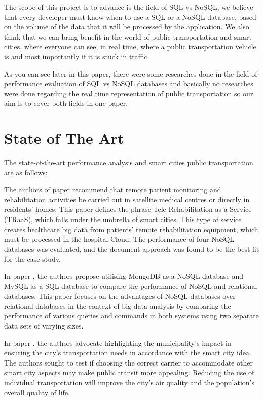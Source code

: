 \tab The scope of this project is to advance is the field of SQL vs NoSQL, we believe that every developer must know when to use a SQL or a NoSQL database, based on the volume of the data that it will be processed by the application. We also think that we can bring benefit in the world of public transportation and smart cities, where everyone can see, in real time, where a public transportation vehicle is and most importantly if it is stuck in traffic. \cite{smart-cities-details-fom-eu}

\tab As you can see later in this paper, there were some researches done in the field of performance evaluation of SQL vs NoSQL databases and basically no researches were done regarding the real time representation of public transportation so our aim is to cover both fields in one paper.

\section {State of The Art}
\tab The state-of-the-art performance analysis and smart cities public transportation are as follows:

\tab The authors of paper \cite{information_management_in_IoT} recommend that remote patient monitoring and rehabilitation activities be carried out in satellite medical centres or directly in residents' homes. This paper defines the phrase Tele-Rehabilitation as a Service (TRaaS), which falls under the umbrella of smart cities. This type of service creates healthcare big data from patients' remote rehabilitation equipment, which must be processed in the hospital Cloud. The performance of four NoSQL databases was evaluated, and the document approach was found to be the best fit for the case study.
\newline

\tab In paper \cite{performance_analysis_SQL_Nosql}, the authors propose utilising MongoDB as a NoSQL database and MySQL as a SQL database to compare the performance of NoSQL and relational databases. This paper focuses on the advantages of NoSQL databases over relational databases in the context of big data analysis by comparing the performance of various queries and commands in both systems using two separate data sets of varying sizes.
\newline

\tab In paper \cite{impact_of_smart_city}, the authors advocate highlighting the municipality's impact in ensuring the city's transportation needs in accordance with the smart city idea. The authors sought to test if choosing the correct carrier to accommodate other smart city aspects may make public transit more appealing. Reducing the use of individual transportation will improve the city's air quality and the population's overall quality of life.
\newline

